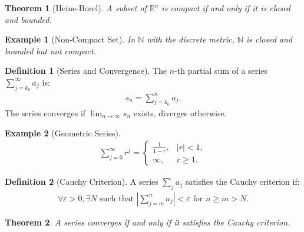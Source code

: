 \documentclass[7pt]{article}
\theoremstyle{definition}
\newtheorem{definition}{Definition}
\theoremstyle{plain}
\newtheorem{theorem}{Theorem}
\newtheorem{example}{Example}
\begin{document}
\begin{theorem}[Heine-Borel]
A subset of $ \mathbb{R}^n $ is compact if and only if it is closed and bounded.
\end{theorem}

\begin{example}[Non-Compact Set]
In $ \mathbb{N} $ with the discrete metric, $ \mathbb{N} $ is closed and bounded but not compact.
\end{example}

\begin{definition}[Series and Convergence]
The $ n $-th partial sum of a series $ \sum_{j=k_0}^\infty a_j $ is:
\begin{align}
s_n = \sum_{j=k_0}^n a_j.
\end{align}
The series converges if $ \lim_{n \to \infty} s_n $ exists, diverges otherwise.
\end{definition}

\begin{example}[Geometric Series]
\begin{align}
\sum_{j=0}^\infty r^j =
\begin{cases} 
\frac{1}{1-r}, & |r| < 1, \\
\infty, & r \geq 1.
\end{cases}
\end{align}
\end{example}

\begin{definition}[Cauchy Criterion]
A series $ \sum_j a_j $ satisfies the Cauchy criterion if:
\begin{align}
\forall \varepsilon > 0, \exists N \text{ such that } \left| \sum_{j=m}^n a_j \right| < \varepsilon \text{ for } n \geq m > N.
\end{align}
\end{definition}

\begin{theorem}
A series converges if and only if it satisfies the Cauchy criterion.
\end{theorem}


\end{document}
